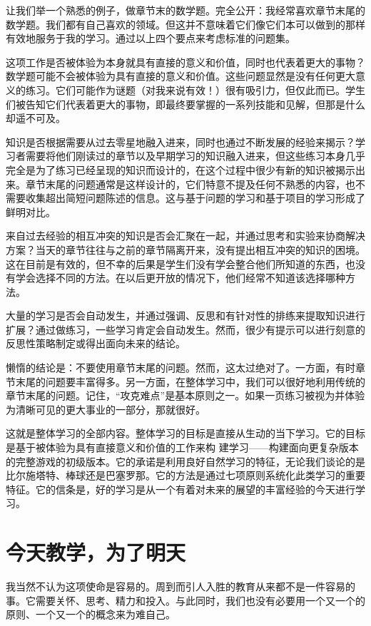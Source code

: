 让我们举一个熟悉的例子，做章节末的数学题。完全公开：我经常喜欢章节末尾的数学题。我们都有自己喜欢的领域。但这并不意味着它们像它们本可以做到的那样有效地服务于我的学习。通过以上四个要点来考虑标准的问题集。

这项工作是否被体验为本身就具有直接的意义和价值，同时也代表着更大的事物？数学题可能不会被体验为具有直接的意义和价值。这些问题显然是没有任何更大意义的练习。它们可能作为谜题（对我来说有效！）很有吸引力，但仅此而已。学生们被告知它们代表着更大的事物，即最终要掌握的一系列技能和见解，但那是什么却遥不可及。

知识是否根据需要从过去零星地融入进来，同时也通过不断发展的经验来揭示？学习者需要将他们刚读过的章节以及早期学习的知识融入进来，但这些练习本身几乎完全是为了练习已经呈现的知识而设计的，在这个过程中很少有新的知识被揭示出来。章节末尾的问题通常是这样设计的，它们特意不提及任何不熟悉的内容，也不需要收集超出简短问题陈述的信息。这与基于问题的学习和基于项目的学习形成了鲜明对比。

来自过去经验的相互冲突的知识是否会汇聚在一起，并通过思考和实验来协商解决方案？当天的章节往往与之前的章节隔离开来，没有提出相互冲突的知识的困境。这在目前是有效的，但不幸的后果是学生们没有学会整合他们所知道的东西，也没有学会选择不同的方法。在以后更开放的情况下，他们经常不知道该选择哪种方法。

大量的学习是否会自动发生，并通过强调、反思和有针对性的排练来提取知识进行扩展？通过做练习，一些学习肯定会自动发生。然而，很少有提示可以进行刻意的反思性策略制定或得出面向未来的结论。

懒惰的结论是：不要使用章节末尾的问题。然而，这太过绝对了。一方面，有时章节末尾的问题要丰富得多。另一方面，在整体学习中，我们可以很好地利用传统的章节末尾的问题。记住，“攻克难点”是基本原则之一。如果一页练习被视为并体验为清晰可见的更大事业的一部分，那就很好。

这就是整体学习的全部内容。整体学习的目标是直接从生动的当下学习。它的目标是基于被体验为具有直接意义和价值的工作来构
建学习——构建面向更复杂版本的完整游戏的初级版本。它的承诺是利用良好自然学习的特征，无论我们谈论的是比尔施塔特、棒球还是巴塞罗那。它的方法是通过七项原则系统化此类学习的重要特征。它的信条是，好的学习是从一个有着对未来的展望的丰富经验的今天进行学习。

\section*{今天教学，为了明天}

我当然不认为这项使命是容易的。周到而引人入胜的教育从来都不是一件容易的事。它需要关怀、思考、精力和投入。与此同时，我们也没有必要用一个又一个的原则、一个又一个的概念来为难自己。

